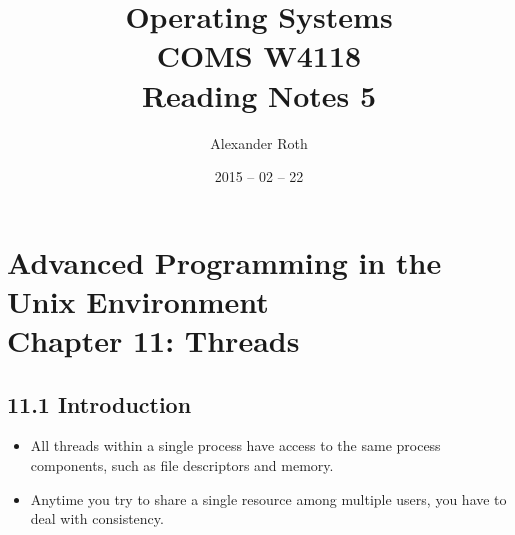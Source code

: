 \documentclass[]{article}
\begin{document}
\newcommand{\code}{\texttt}
\newtheorem{thm}{Theorem}
\title{Operating Systems \\ COMS W4118 \\ Reading Notes 5}
\author{Alexander Roth}
\date{2015 -- 02 -- 22}
\maketitle

\section*{Advanced Programming in the Unix Environment \\ Chapter 11: Threads}
\subsection*{11.1 Introduction}
\begin{itemize}
\item All threads within a single process have access to the same process
components, such as file descriptors and memory.
\item Anytime you try to share a single resource among multiple users, you have
to deal with consistency.
\end{itemize}
\end{document}
